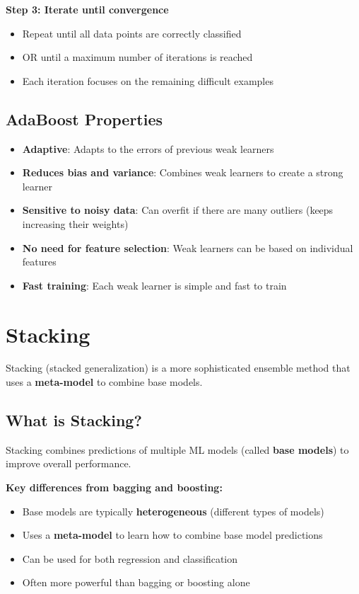 \documentclass[11pt,a4paper]{article}
\theoremstyle{definition}
\theoremstyle{plain}
\theoremstyle{remark}
\begin{document}
\textbf{Step 3: Iterate until convergence}
\begin{itemize}
    \item Repeat until all data points are correctly classified
    \item OR until a maximum number of iterations is reached
    \item Each iteration focuses on the remaining difficult examples
\end{itemize}

\subsection{AdaBoost Properties}

\begin{itemize}
    \item \textbf{Adaptive}: Adapts to the errors of previous weak learners
    
    \item \textbf{Reduces bias and variance}: Combines weak learners to create a strong learner
    
    \item \textbf{Sensitive to noisy data}: Can overfit if there are many outliers (keeps increasing their weights)
    
    \item \textbf{No need for feature selection}: Weak learners can be based on individual features
    
    \item \textbf{Fast training}: Each weak learner is simple and fast to train
\end{itemize}

\section{Stacking}

Stacking (stacked generalization) is a more sophisticated ensemble method that uses a \textbf{meta-model} to combine base models.

\subsection{What is Stacking?}

Stacking combines predictions of multiple ML models (called \textbf{base models}) to improve overall performance.

\textbf{Key differences from bagging and boosting:}
\begin{itemize}
    \item Base models are typically \textbf{heterogeneous} (different types of models)
    \item Uses a \textbf{meta-model} to learn how to combine base model predictions
    \item Can be used for both regression and classification
    \item Often more powerful than bagging or boosting alone
\end{itemize}
\end{document}
